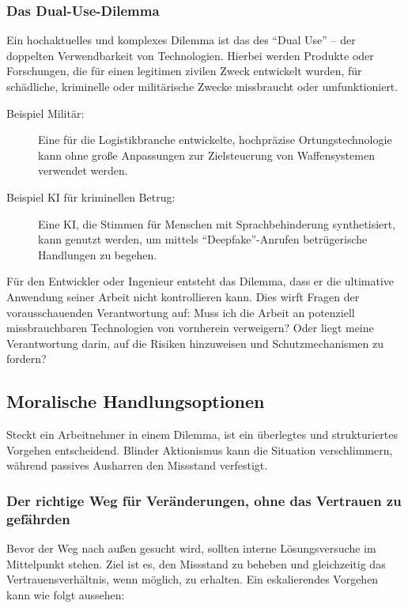 \documentclass[
    12pt,               %
    a4paper,            %
    ngerman             %
]{scrartcl}
\begin{document}
\subsubsection*{Das Dual-Use-Dilemma}
Ein hochaktuelles und komplexes Dilemma ist das des \enquote{Dual Use} – der doppelten Verwendbarkeit von Technologien. Hierbei werden Produkte oder Forschungen, die für einen legitimen zivilen Zweck entwickelt wurden, für schädliche, kriminelle oder militärische Zwecke missbraucht oder umfunktioniert.
\begin{description}
    \item[Beispiel Militär:] Eine für die Logistikbranche entwickelte, hochpräzise Ortungstechnologie kann ohne große Anpassungen zur Zielsteuerung von Waffensystemen verwendet werden.
    \item[Beispiel KI für kriminellen Betrug:] Eine KI, die Stimmen für Menschen mit Sprachbehinderung synthetisiert, kann genutzt werden, um mittels \enquote{Deepfake}-Anrufen betrügerische Handlungen zu begehen.
\end{description}
Für den Entwickler oder Ingenieur entsteht das Dilemma, dass er die ultimative Anwendung seiner Arbeit nicht kontrollieren kann. Dies wirft Fragen der vorausschauenden Verantwortung auf: Muss ich die Arbeit an potenziell missbrauchbaren Technologien von vornherein verweigern? Oder liegt meine Verantwortung darin, auf die Risiken hinzuweisen und Schutzmechanismen zu fordern?

\subsection{Moralische Handlungsoptionen}
Steckt ein Arbeitnehmer in einem Dilemma, ist ein überlegtes und strukturiertes Vorgehen entscheidend. Blinder Aktionismus kann die Situation verschlimmern, während passives Ausharren den Missstand verfestigt.

\subsubsection*{Der richtige Weg für Veränderungen, ohne das Vertrauen zu gefährden}
Bevor der Weg nach außen gesucht wird, sollten interne Lösungsversuche im Mittelpunkt stehen. Ziel ist es, den Missstand zu beheben und gleichzeitig das Vertrauensverhältnis, wenn möglich, zu erhalten. Ein eskalierendes Vorgehen kann wie folgt aussehen:
\end{document}

